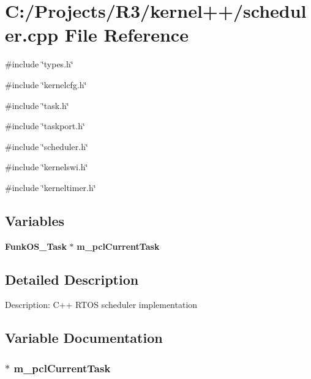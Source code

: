 \section{C:/Projects/R3/kernel++/scheduler.cpp File Reference}
\label{scheduler_8cpp}
{\ttfamily \#include \char`\"{}types.h\char`\"{}}\par
{\ttfamily \#include \char`\"{}kernelcfg.h\char`\"{}}\par
{\ttfamily \#include \char`\"{}task.h\char`\"{}}\par
{\ttfamily \#include \char`\"{}taskport.h\char`\"{}}\par
{\ttfamily \#include \char`\"{}scheduler.h\char`\"{}}\par
{\ttfamily \#include \char`\"{}kernelswi.h\char`\"{}}\par
{\ttfamily \#include \char`\"{}kerneltimer.h\char`\"{}}\par
\subsection*{Variables}
\begin{DoxyCompactItemize}
\item 
{\bf FunkOS\_\-Task} $\ast$ {\bf m\_\-pclCurrentTask}
\end{DoxyCompactItemize}


\subsection{Detailed Description}
Description: C++ RTOS scheduler implementation 

\subsection{Variable Documentation}
\subsubsection[{m\_\-pclCurrentTask}]{$\ast$ {\bf m\_\-pclCurrentTask}}\label{scheduler_8cpp_ab36c9eec14f859acb1d9a9505b09a8dc}
